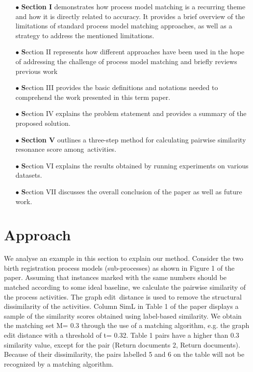 \documentclass[runningheads]{llncs}
\begin{document}
\begin{itemize}
     \item[$\bullet$] \textbf{Section I} demonstrates how process model matching is a recurring theme and how it is directly related to accuracy. It provides a brief overview of the limitations of standard process model matching approaches, as well as a strategy to address the mentioned limitations. \newline

    \item [$\bullet$] \textbf Section II represents how different approaches have been used in the hope of addressing the challenge of process model matching and briefly reviews previous work \newline
    
    \item [$\bullet$]  \textbf Section III provides the basic definitions and notations needed to comprehend the work presented in this term paper.\newline
    
    \item [$\bullet$]  \textbf Section IV explains the problem statement and provides a summary of the proposed solution.\newline
     
    \item [$\bullet$]  \textbf{Section V} outlines a three-step method for calculating pairwise similarity resonance score among activities.\newline
    
   \item [$\bullet$]  \textbf Section VI explains the results obtained by running experiments on various datasets.\newline
    
    \item [$\bullet$]  \textbf Section VII discusses the overall conclusion of the paper as well as future work.
\end{itemize}

\section{Approach}
We analyse an example in this section to explain our method. Consider the two birth registration process models (sub-processes) as shown in Figure 1 of the paper. Assuming that instances marked with the same numbers should be matched according to some ideal baseline, we calculate the pairwise similarity of the process activities. The graph edit distance is used to remove the structural dissimilarity of the activities. Column SimL in Table 1 of the paper displays a sample of the similarity scores obtained using label-based similarity. We obtain the matching set M= 0.3 through the use of a matching algorithm, e.g. the graph edit distance with a threshold of t= 0.32. Table 1 pairs have a higher than 0.3 similarity value, except for the pair (Return documents 2, Return documents). Because of their dissimilarity, the pairs labelled 5 and 6 on the table will not be recognized by a matching algorithm\cite{ref10}.\newline 
\end{document}
